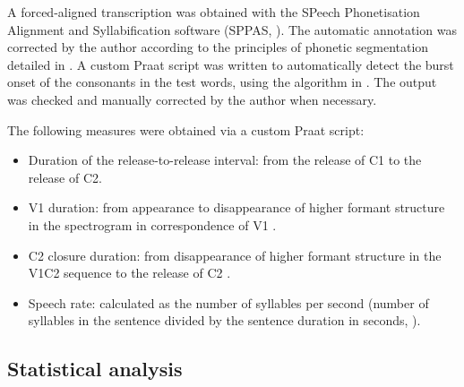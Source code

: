 \documentclass[
  12pt,
  a4paper,
]{article}
\providecommand{\tightlist}{%
  \setlength{\itemsep}{0pt}\setlength{\parskip}{0pt}}
\begin{document}
A forced-aligned transcription was obtained with the SPeech
Phonetisation Alignment and Syllabification software (SPPAS,
\citealt{bigi2015}). The automatic annotation was corrected by the
author according to the principles of phonetic segmentation detailed in
\citet{machac2009}. A custom Praat script was written to automatically
detect the burst onset of the consonants in the test words, using the
algorithm in \citet{ananthapadmanabha2014}. The output was checked and
manually corrected by the author when necessary.

The following measures were obtained via a custom Praat script:

\begin{itemize}
\tightlist
\item
  Duration of the release-to-release interval: from the release of C1 to
  the release of C2.
\item
  V1 duration: from appearance to disappearance of higher formant
  structure in the spectrogram in correspondence of V1
  \citep{machac2009}.
\item
  C2 closure duration: from disappearance of higher formant structure in
  the V1C2 sequence to the release of C2 \citep{machac2009}.
\item
  Speech rate: calculated as the number of syllables per second (number
  of syllables in the sentence divided by the sentence duration in
  seconds, \citealt{plug2018a}).
\end{itemize}

\hypertarget{statistical-analysis}{%
\subsection{Statistical analysis}\label{statistical-analysis}}

\label{s:bayes}
\end{document}
